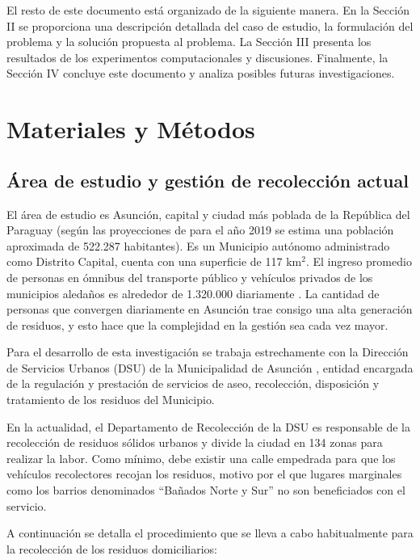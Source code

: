 \documentclass[conference]{IEEEtran}
\begin{document}
El resto de este documento está organizado de la siguiente manera. En la Sección II se proporciona una descripción detallada del caso de estudio, la formulación del problema y la solución propuesta al problema. La Sección III presenta los resultados de los experimentos computacionales y discusiones. Finalmente, la Sección IV concluye este documento y analiza posibles futuras investigaciones.

\section{Materiales y Métodos}

\subsection{Área de estudio y gestión de recolección actual}

El área de estudio es Asunción, capital y ciudad más poblada de la República del Paraguay (según las proyecciones de \cite{2015Proyeccion2000-2025} para el año 2019 se estima una población aproximada de 522.287 habitantes). Es un Municipio autónomo administrado como Distrito Capital, cuenta con una superficie de 117 km$^{2}$. El ingreso promedio de personas en ómnibus del transporte público y vehículos privados de los municipios aledaños es alrededor de 1.320.000 diariamente \cite{DiarioABCColor2016PorColor}. La cantidad de personas que convergen diariamente en Asunción trae consigo una alta generación de residuos, y esto hace que la complejidad en la gestión sea cada vez mayor.

Para el desarrollo de esta investigación se trabaja estrechamente con la Dirección de Servicios Urbanos (DSU) de la Municipalidad de Asunción \cite{DSUMisc}, entidad encargada de la regulación y prestación de servicios de aseo, recolección, disposición y tratamiento de los residuos del Municipio.

En la actualidad, el Departamento de Recolección de la DSU es responsable de la recolección de residuos sólidos urbanos y divide la ciudad en 134 zonas para realizar la labor. Como mínimo, debe existir una calle empedrada para que los vehículos recolectores recojan los residuos, motivo por el que lugares marginales como los barrios denominados ``Bañados Norte y Sur'' no son beneficiados con el servicio.

A continuación se detalla el procedimiento que se lleva a cabo habitualmente para la recolección de los residuos domiciliarios:
\end{document}
